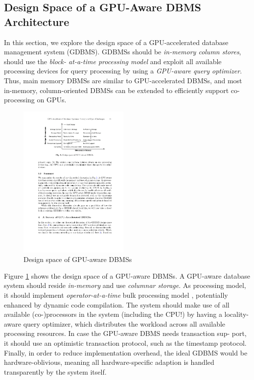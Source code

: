 \documentclass[twocolumn]{article}
\begin{document}
\subsection{Design Space of a GPU-Aware DBMS Architecture}
In this section, we explore the design space of a GPU-accelerated database management system (GDBMS). 
GDBMSs should be \textit{in-memory column stores}, should use the \textit{block- at-a-time processing model }and exploit all available processing devices for query processing by using a \textit{GPU-aware query optimizer}.
 Thus, main memory DBMSs are similar to GPU-accelerated DBMSs, and most in-memory, column-oriented DBMSs can be extended to efficiently support co-processing on GPUs.
\begin{figure}[htb]
        \centering
        \includegraphics[width=0.48\textwidth]{design-space.pdf}
        \caption{Design space of GPU-aware DBMSs}
        \label{fig:design-space}
\end{figure}
Figure \ref{fig:design-space} shows the design space of a GPU-aware DBMSs.
A GPU-aware database system should reside \textit{in-memory} and use \textit{columnar storage}. 
As processing model, it should implement \textit{operator-at-a-time} bulk processing model \cite{Manegold:2009}, potentially enhanced by dynamic code compilation. 
The system should make use of all available (co-)processors in the system (including the CPU!) by having a locality-aware query optimizer, which distributes the workload across all available processing resources. In case the GPU-aware DBMS needs transaction sup- port, it should use an optimistic transaction protocol, such as the timestamp protocol. Finally, in order to reduce implementation overhead, the ideal GDBMS would be hardware-oblivious, meaning all hardware-specific adaption is handled transparently by the system itself.
\end{document}
